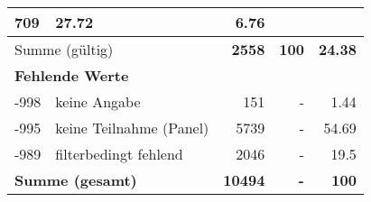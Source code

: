 \begin{longtable}{lXrrr}
       \num{709} &
       \num[round-mode=places,round-precision=2]{27,72} &
         \num[round-mode=places,round-precision=2]{6,76} \\
     \midrule
     \multicolumn{2}{l}{Summe (gültig)} &
       \textbf{\num{2558}} &
     \textbf{100} &
       \textbf{\num[round-mode=places,round-precision=2]{24,38}} \\
     \multicolumn{5}{l}{\textbf{Fehlende Werte}}\\
       -998 &
       keine Angabe &
         \num{151} &
        - &
         \num[round-mode=places,round-precision=2]{1,44} \\
       -995 &
       keine Teilnahme (Panel) &
         \num{5739} &
        - &
         \num[round-mode=places,round-precision=2]{54,69} \\
       -989 &
       filterbedingt fehlend &
         \num{2046} &
        - &
         \num[round-mode=places,round-precision=2]{19,5} \\
     \midrule
     \multicolumn{2}{l}{\textbf{Summe (gesamt)}} &
          \textbf{\num{10494}} &
        \textbf{-} &
        \textbf{100} \\
     \bottomrule
     \end{longtable}
     
